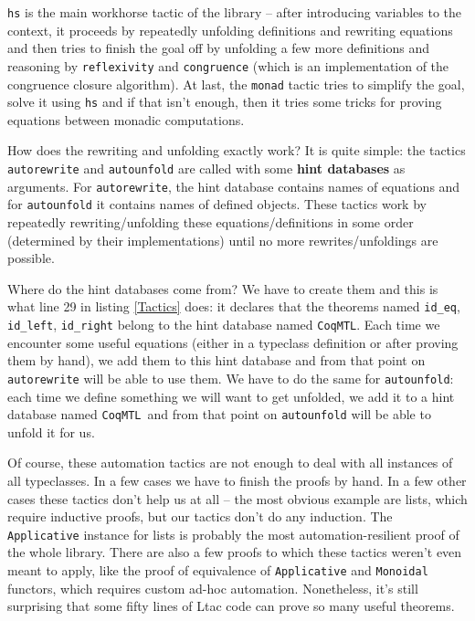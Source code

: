 \documentclass[declaration,inz,english,shortabstract]{iithesis}
\newcommand{\m}[1]{\texttt{#1}}
\newcommand{\hintdb}{\m{CoqMTL}}
\begin{document}
\m{hs} is the main workhorse tactic of the library -- after introducing variables to the context, it proceeds by repeatedly unfolding definitions and rewriting equations and then tries to finish the goal off by unfolding a few more definitions and reasoning by \m{reflexivity} and \m{congruence} (which is an implementation of the congruence closure algorithm). At last, the \m{monad} tactic tries to simplify the goal, solve it using \m{hs} and if that isn't enough, then it tries some tricks for proving equations between monadic computations.

How does the rewriting and unfolding exactly work? It is quite simple: the tactics \m{autorewrite} and \m{autounfold} are called with some \textbf{hint databases} as arguments. For \m{autorewrite}, the hint database contains names of equations and for \m{autounfold} it contains names of defined objects. These tactics work by repeatedly rewriting/unfolding these equations/definitions in some order (determined by their implementations) until no more rewrites/unfoldings are possible.

Where do the hint databases come from? We have to create them and this is what line 29 in listing \ref{Tactics} does: it declares that the theorems named \m{id\_eq}, \m{id\_left}, \m{id\_right} belong to the hint database named \hintdb. Each time we encounter some useful equations (either in a typeclass definition or after proving them by hand), we add them to this hint database and from that point on \m{autorewrite} will be able to use them. We have to do the same for \m{autounfold}: each time we define something we will want to get unfolded, we add it to a hint database named \hintdb\ and from that point on \m{autounfold} will be able to unfold it for us.

Of course, these automation tactics are not enough to deal with all instances of all typeclasses. In a few cases we have to finish the proofs by hand. In a few other cases these tactics don't help us at all -- the most obvious example are lists, which require inductive proofs, but our tactics don't do any induction. The \m{Applicative} instance for lists is probably the most automation-resilient proof of the whole library. There are also a few proofs to which these tactics weren't even meant to apply, like the proof of equivalence of \m{Applicative} and \m{Monoidal} functors, which requires custom ad-hoc automation. Nonetheless, it's still surprising that some fifty lines of Ltac code can prove so many useful theorems.

\end{document}
